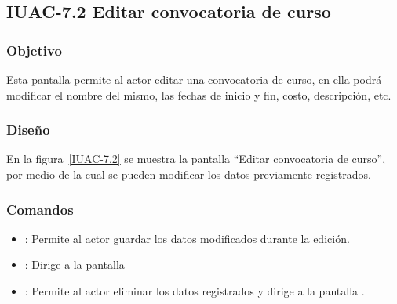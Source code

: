 \subsection{IUAC-7.2 Editar convocatoria de curso}
 
\subsubsection{Objetivo}

    Esta pantalla permite al actor  editar una convocatoria de curso, en ella podrá modificar el nombre del mismo, las fechas de inicio y fin, costo, descripción, etc.

\subsubsection{Diseño}

    En la figura~\ref{IUAC-7.2} se muestra la pantalla ``Editar convocatoria de curso'', por medio de la cual se pueden modificar los datos previamente registrados. \\


\subsubsection{Comandos}
\begin{itemize}
	\item {}: Permite al actor guardar los datos modificados durante la edición.
	\item {}: Dirige a la pantalla 
	\item {}: Permite al actor eliminar los datos registrados y dirige a la pantalla .
\end{itemize}

